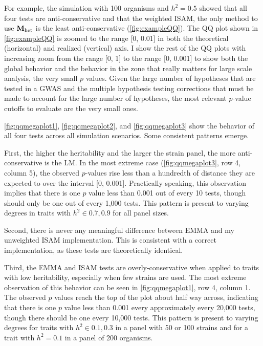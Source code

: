 For example, the simulation with 100 organisms and $h^2 = 0.5$ showed that all four tests are anti-conservative and that the weighted ISAM, the only method to use $\mathbf{M}_\text{het}$ is the least anti-conservative (\autoref{fig:exampleQQ}).
The QQ plot shown in \autoref{fig:exampleQQ} is zoomed to the range [0, 0.01] in both the theoretical (horizontal) and realized (vertical) axis.
I show the rest of the QQ plots with increasing zoom from the range [0, 1] to the range [0, 0.001] to show both the global behavior and the behavior in the zone that really matters for large scale analysis, the very small $p$ values.
Given the large number of hypotheses that are tested in a GWAS and the multiple hypothesis testing corrections that must be made to account for the large number of hypotheses, the most relevant $p$-value cutoffs to evaluate are the very small ones.

\autoref{fig:qqmegaplot1}, \autoref{fig:qqmegaplot2}, and \autoref{fig:qqmegaplot3} show the behavior of all four tests across all simulation scenarios.
Some consistent patterns emerge.

First, the higher the heritability and the larger the strain panel, the more anti-conservative is the LM.
In the most extreme case (\autoref{fig:qqmegaplot3}, row 4, column 5), the observed $p$-values rise less than a hundredth of distance they are expected to over the interval [0, 0.001].
Practically speaking, this observation implies that there is one $p$ value less than 0.001 out of every 10 tests, though should only be one out of every 1,000 tests.
This pattern is present to varying degrees in traits with $h^2 \in {0.7, 0.9}$ for all panel sizes.

Second, there is never any meaningful difference between EMMA and my unweighted ISAM implementation.
This is consistent with a correct implementation, as these tests are theoretically identical.

Third, the EMMA and ISAM tests are overly-conservative when applied to traits with low heritability, especially when few strains are used.
The most extreme observation of this behavior can be seen in \autoref{fig:qqmegaplot1}, row 4, column 1.
The observed $p$ values reach the top of the plot about half way across, indicating that there is one $p$ value less than 0.001 every approximately every 20,000 tests, though there should be one every 10,000 tests.
This pattern is present to varying degrees for traits with $h^2 \in {0.1, 0.3}$ in a panel with 50 or 100 strains and for a trait with $h^2 = 0.1$ in a panel of 200 organisms.

